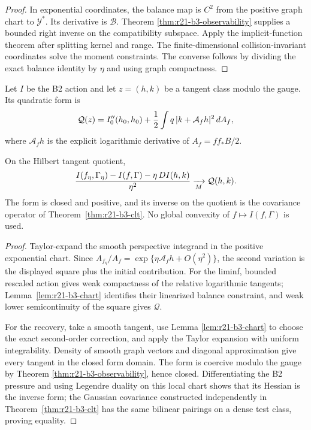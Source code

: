 \begin{proof}
In exponential coordinates, the balance map is $C^2$ from the positive graph
chart to $\mathcal Y^*$.  Its derivative is $\mathcal B$.  Theorem
\ref{thm:r21-b3-observability} supplies a bounded right inverse on the
compatibility subspace.  Apply the implicit-function theorem after splitting
kernel and range.  The finite-dimensional collision-invariant coordinates
solve the moment constraints.  The converse follows by dividing the exact
balance identity by $\eta$ and using graph compactness.
\end{proof}

Let $I$ be the B2 action and let $z=(h,k)$ be a tangent class modulo the gauge.
Its quadratic form is
\[
 \mathcal Q(z)=I_0''(h_0,h_0)+
 {1\over2}\int q\,|k+\mathcal A_fh|^2\,dA_f,
\]
where $\mathcal A_fh$ is the explicit logarithmic derivative of
$A_f=ff_*B/2$.

\begin{theorem}
\label{thm:r21-b3-mosco}
On the Hilbert tangent quotient,
\[
 {I(f_\eta,\Gamma_\eta)-I(f,\Gamma)
  -\eta\,DI(h,k)\over\eta^2}
 \xrightarrow[M]{ }\mathcal Q(h,k).
\]
The form is closed and positive, and its inverse on the quotient is the
covariance operator of Theorem~\ref{thm:r21-b3-clt}.  No global convexity of
$f\mapsto I(f,\Gamma)$ is used.
\end{theorem}

\begin{proof}
Taylor-expand the smooth perspective integrand in the positive exponential
chart.  Since
$A_{f_\eta}/A_f=\exp\{\eta\mathcal A_fh+O(\eta^2)\}$, the second variation is
the displayed square plus the initial contribution.  For the liminf, bounded
rescaled action gives weak compactness of the relative logarithmic tangents;
Lemma~\ref{lem:r21-b3-chart} identifies their linearized balance constraint,
and weak lower semicontinuity of the square gives $\mathcal Q$.

For the recovery, take a smooth tangent, use Lemma
\ref{lem:r21-b3-chart} to choose the exact second-order correction, and apply
the Taylor expansion with uniform integrability.  Density of smooth graph
vectors and diagonal approximation give every tangent in the closed form
domain.  The form is coercive modulo the gauge by Theorem
\ref{thm:r21-b3-observability}, hence closed.  Differentiating the B2 pressure
and using Legendre duality on this local chart shows that its Hessian is the
inverse form; the Gaussian covariance constructed independently in
Theorem~\ref{thm:r21-b3-clt} has the same bilinear pairings on a dense test
class, proving equality.
\end{proof}

